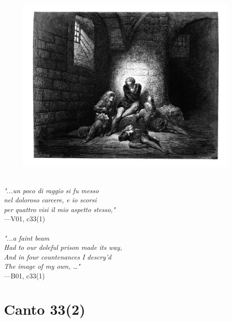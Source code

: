 \documentclass[../Dore_vision.tex]{subfiles}
\begin{document}
\begin{figure}[ht]
\centering
\includegraphics[height=\figsize]{illustrations/book_1/V01, c33(1).jpg}
\end{figure}

\begin{center}
\begin{minipage}{0.8\linewidth}
\textit{\\
"...un poco di raggio si fu messo\\nel doloroso carcere, e io scorsi\\per quattro visi il mio aspetto stesso,"} \\
—V01, c33(1) \\~\\
\textit{"...a faint beam\\Had to our doleful prison made its way,\\And in four countenances I descry'd\\The image of my own, …"} \\
—B01, c33(1)
\end{minipage}
\end{center}

\newpage

\section{Canto 33(2)}
\end{document}
